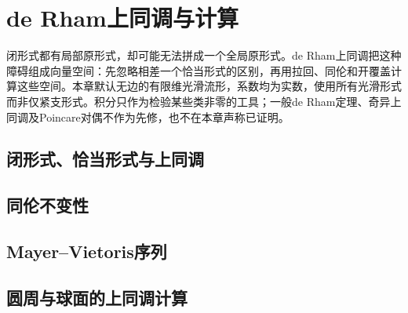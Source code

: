 \chapter{de Rham上同调与计算}
\label{ch:09-cohomology}

闭形式都有局部原形式，却可能无法拼成一个全局原形式。de Rham上同调把这种障碍组成向量空间：先忽略相差一个恰当形式的区别，再用拉回、同伦和开覆盖计算这些空间。本章默认无边的有限维光滑流形，系数均为实数，使用所有光滑形式而非仅紧支形式。积分只作为检验某些类非零的工具；一般de Rham定理、奇异上同调及Poincare对偶不作为先修，也不在本章声称已证明。

\section{闭形式、恰当形式与上同调}


\section{同伦不变性}


\section{Mayer--Vietoris序列}


\section{圆周与球面的上同调计算}



